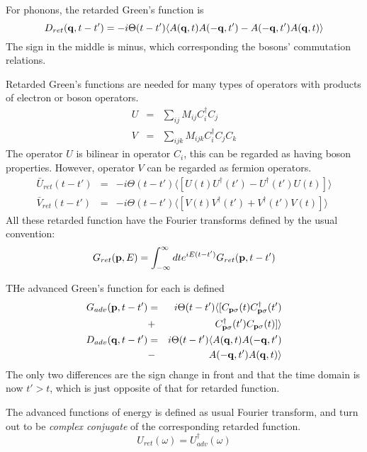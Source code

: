 For phonons, the retarded Green's function is
\begin{equation}
  D_{ret}(\mathbf{q},t-t') = -i\Theta(t-t')\langle A(\mathbf{q},t)A(-\mathbf{q},t') - A(-\mathbf{q},t')A(\mathbf{q},t)\rangle \label{3.85}
\end{equation}
The sign in the middle is minus, which corresponding the bosons' commutation relations.

Retarded Green's functions are needed for many types of operators with products of electron or boson operators.
\begin{eqnarray}
  U&=& \sum_{ij}M_{ij}C^\dagger_iC_j \label{3.86}\\
  V&=& \sum_{ijk}M_{ijk}C^\dagger_i C_j C_k \label{3.87}
\end{eqnarray}
The operator $U$ is bilinear in operator $C_i$, this can be regarded as having boson properties.
However, operator $V$ can be regarded as fermion operators.
\begin{eqnarray}
  \bar{U}_{ret}(t-t') &=& -i\Theta(t-t')\langle [U(t)U^\dagger(t') - U^\dagger(t')U(t)] \rangle \label{3.88} \\
  \bar{V}_{ret}(t-t') &=& -i\Theta(t-t')\langle [V(t)V^\dagger(t') + V^\dagger(t')V(t)] \rangle \label{3.89}
\end{eqnarray}
All these retarded function have the Fourier transforms defined by the usual convention:
\begin{equation}
  G_{ret}(\mathbf{p},E) = \int_{-\infty}^\infty dt e^{iE(t-t')} G_{ret}(\mathbf{p},t-t') \label{3.90}
\end{equation}

THe advanced Green's function for each is defined
\begin{eqnarray}
  G_{adv}(\mathbf{p},t-t')&=&i\Theta(t-t')\langle [C_{\mathbf{p}\sigma}(t)C^\dagger_{\mathbf{p}\sigma}(t') \nonumber \\
  &+& C^\dagger_{\mathbf{p}\sigma}(t')C_{\mathbf{p}\sigma}(t)] \rangle \label{3.93} \\
  D_{adv}(\mathbf{q},t-t') &=& i\Theta(t-t')\langle A(\mathbf{q},t)A(-\mathbf{q},t') \nonumber \\
  &-& A(-\mathbf{q},t')A(\mathbf{q},t)\rangle \label{3.94}
\end{eqnarray}
The only two differences are the sign change in front and that the time domain is now $t'>t$, which is just opposite of that for retarded function.

The advanced functions of energy is defined as usual Fourier transform, and turn out to be \textit{complex conjugate} of the corresponding retarded function.
\begin{equation}
  U_{ret}(\omega) = U_{adv}^\dagger(\omega) \label{3.98}
\end{equation}

